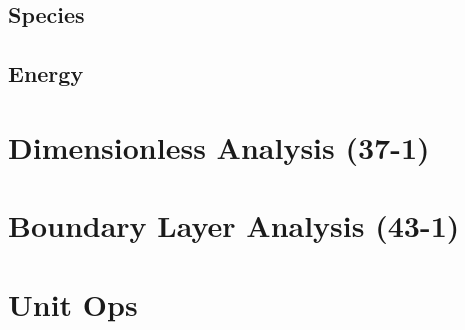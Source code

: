 \documentclass{mitqualif}
\begin{document}
\subsection{Species}
\subsection{Energy}
\section{Dimensionless Analysis (37-1)}

\section{Boundary Layer Analysis (43-1)}

\section{Unit Ops  }
\newpage
\end{document}

